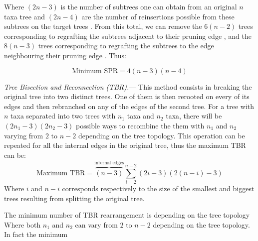\documentclass[12pt,letterpaper]{article}
\renewcommand{\subsubsection}[1]{%
\vspace{2ex}
\noindent
\textit{#1.}---}
\begin{document}
Where $(2n-3)$ is the number of subtrees one can obtain from an original $n$ taxa tree and $(2n-4)$ are the number of reinsertions possible from these subtrees on the target trees \cite{allen2001subtree}.
From this total, we can remove the $6(n-2)$ trees corresponding to regrafting the subtrees adjacent to their pruning edge \citep[resulting in the same topology; ][]{allen2001subtree}, and the $8(n-3)$ trees corresponding to regrafting the subtrees to the edge neighbouring their pruning edge \citep{allen2001subtree}.
Thus: 

\begin{equation}
    \text{Minimum SPR}=4(n-3)(n-4) %
\end{equation}

\citep[c.f.][]{felsenstein2004inferring}
\subsubsection{Tree Bisection and Reconnection (TBR)}
This method consists in breaking the original tree into two distinct trees.
One of them is then rerooted on every of its edges and then rebranched on any of the edges of the second tree.
For a tree with $n$ taxa separated into two trees with $n_{1}$ taxa and $n_{2}$ taxa, there will be $(2n_{1}-3)(2n_{2}-3)$ possible ways to recombine the them \citep{felsenstein2004inferring} with $n_{1}$ and $n_{2}$ varying from $2$ to $n-2$ depending on the tree topology.
This operation can be repeated for all the internal edges in the original tree, thus the maximum TBR can be:
\begin{equation}
    \text{Maximum TBR} = \overbrace{(n-3)}^{\text{internal edges}} \sum_{i=2}^{n-2} (2i-3)(2(n-i)-3) %
\end{equation}
Where $i$ and $n-i$ corresponds respectively to the size of the smallest and biggest trees resulting from splitting the original tree.

The minimum number of TBR rearrangement is depending on the tree topology
Where both $n_{1}$ and $n_{2}$ can vary from $2$ to $n-2$ depending on the tree topology.
In fact the minimum
\end{document}
